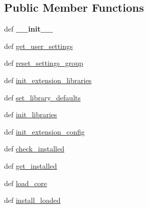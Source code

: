 \subsection*{Public Member Functions}
\begin{DoxyCompactItemize}
\item 
\hypertarget{classcommotion__client_1_1utils_1_1extension__manager_1_1ExtensionManager_a98ed5baeb8363089a665d7a4fbcc6198}{def {\bfseries \+\_\+\+\_\+init\+\_\+\+\_\+}}\label{classcommotion__client_1_1utils_1_1extension__manager_1_1ExtensionManager_a98ed5baeb8363089a665d7a4fbcc6198}

\item 
def \hyperlink{classcommotion__client_1_1utils_1_1extension__manager_1_1ExtensionManager_a25c38ac92dceebe57891ce0ed422505e}{get\+\_\+user\+\_\+settings}
\item 
def \hyperlink{classcommotion__client_1_1utils_1_1extension__manager_1_1ExtensionManager_ae90e7bfde555094ce23154a21baafd02}{reset\+\_\+settings\+\_\+group}
\item 
def \hyperlink{classcommotion__client_1_1utils_1_1extension__manager_1_1ExtensionManager_a5a94323a3528a6af3bf009eb302fa729}{init\+\_\+extension\+\_\+libraries}
\item 
def \hyperlink{classcommotion__client_1_1utils_1_1extension__manager_1_1ExtensionManager_ab2a55f25d0f1dbce2924c28513fac830}{set\+\_\+library\+\_\+defaults}
\item 
def \hyperlink{classcommotion__client_1_1utils_1_1extension__manager_1_1ExtensionManager_a2edb9c39e0b8e5143c245089170182a3}{init\+\_\+libraries}
\item 
def \hyperlink{classcommotion__client_1_1utils_1_1extension__manager_1_1ExtensionManager_ae751a1b407e33af012d41ec44f2ce717}{init\+\_\+extension\+\_\+config}
\item 
def \hyperlink{classcommotion__client_1_1utils_1_1extension__manager_1_1ExtensionManager_a549fdfd52d8e355e4bac34907ef74e2a}{check\+\_\+installed}
\item 
def \hyperlink{classcommotion__client_1_1utils_1_1extension__manager_1_1ExtensionManager_aa2b5054f6495fbc20e556f5713550d01}{get\+\_\+installed}
\item 
def \hyperlink{classcommotion__client_1_1utils_1_1extension__manager_1_1ExtensionManager_a98f5f3c261f083885a9b0528dcdafd34}{load\+\_\+core}
\item 
def \hyperlink{classcommotion__client_1_1utils_1_1extension__manager_1_1ExtensionManager_a58bcb83cefe458d4affcb185785694c6}{install\+\_\+loaded}

\end{DoxyCompactItemize}
